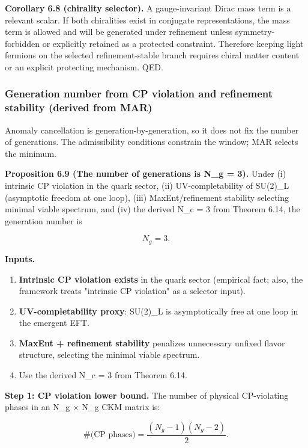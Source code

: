 \textbf{Corollary 6.8 (chirality selector).} A gauge-invariant Dirac mass term is a relevant scalar. If both chiralities exist in conjugate representations, the mass term is allowed and will be generated under refinement unless symmetry-forbidden or explicitly retained as a protected constraint. Therefore keeping light fermions on the selected refinement-stable branch requires chiral matter content or an explicit protecting mechanism. QED.

\subsubsection{Generation number from CP violation and refinement stability (derived from MAR)}\label{64-generation-number-from-cp-violation-and-refinement-stability-derived-from-mar}

Anomaly cancellation is generation-by-generation, so it does not fix the number of generations. The admissibility conditions constrain the window; MAR selects the minimum.

\textbf{Proposition 6.9 (The number of generations is N\_g = 3).} Under (i) intrinsic CP violation in the quark sector, (ii) UV-completability of SU(2)\_L (asymptotic freedom at one loop), (iii) MaxEnt/refinement stability selecting minimal viable spectrum, and (iv) the derived N\_c = 3 from Theorem 6.14, the generation number is

\[
N_g = 3.
\]

\textbf{Inputs.}

\begin{enumerate}
\def\labelenumi{\arabic{enumi}.}
\tightlist
\item
  \textbf{Intrinsic CP violation exists} in the quark sector (empirical fact; also, the framework treats "intrinsic CP violation" as a selector input).
\item
  \textbf{UV-completability proxy}: SU(2)\_L is asymptotically free at one loop in the emergent EFT.
\item
  \textbf{MaxEnt + refinement stability} penalizes unnecessary unfixed flavor structure, selecting the minimal viable spectrum.
\item
  Use the derived N\_c = 3 from Theorem 6.14.
\end{enumerate}

\textbf{Step 1: CP violation lower bound.} The number of physical CP-violating phases in an N\_g \ensuremath{\times} N\_g CKM matrix is:

\[
\#\text{(CP phases)} = \frac{(N_g - 1)(N_g - 2)}{2}.
\]

